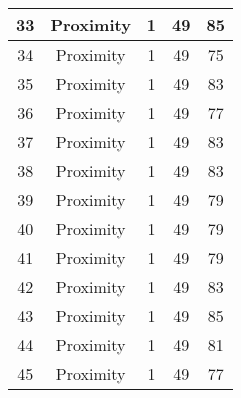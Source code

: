 \documentclass[results.tex]{subfiles}
\begin{document}
\begin{center}
\begin{tabular}{| c || c | c | c | c |}
            \hline
            33                      & Proximity                    & 1                      & 49                      & 85                   \\
            \hline
            34                      & Proximity                    & 1                      & 49                      & 75                   \\
            \hline
            35                      & Proximity                    & 1                      & 49                      & 83                   \\
            \hline
            36                      & Proximity                    & 1                      & 49                      & 77                   \\
            \hline
            37                      & Proximity                    & 1                      & 49                      & 83                   \\
            \hline
            38                      & Proximity                    & 1                      & 49                      & 83                   \\
            \hline
            39                      & Proximity                    & 1                      & 49                      & 79                   \\
            \hline
            40                      & Proximity                    & 1                      & 49                      & 79                   \\
            \hline
            41                      & Proximity                    & 1                      & 49                      & 79                   \\
            \hline
            42                      & Proximity                    & 1                      & 49                      & 83                   \\
            \hline
            43                      & Proximity                    & 1                      & 49                      & 85                   \\
            \hline
            44                      & Proximity                    & 1                      & 49                      & 81                   \\
            \hline
            45                      & Proximity                    & 1                      & 49                      & 77                   \\

\end{tabular}
\end{center}
\end{document}
